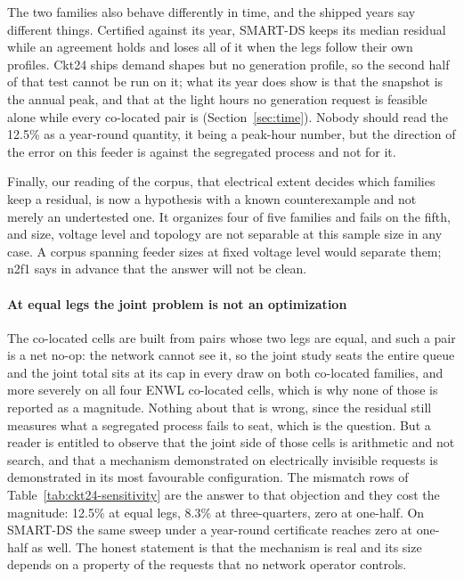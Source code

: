 \documentclass[review,authoryear,12pt]{elsarticle}
\begin{document}
The two families also behave differently in time, and the shipped years say
different things. Certified against its year, SMART-DS keeps its median
residual while an agreement holds and loses all of it when the legs follow
their own profiles. Ckt24 ships demand shapes but no generation profile, so the
second half of that test cannot be run on it; what its year does show is that
the snapshot is the annual peak, and that at the light hours no generation
request is feasible alone while every co-located pair is
(Section~\ref{sec:time}). Nobody should read the 12.5\% as a year-round
quantity, it being a peak-hour number, but the direction of the error on
this feeder is against the segregated process and not for it.

Finally, our reading of the corpus, that electrical extent decides which
families keep a residual, is now a hypothesis with a known counterexample
and not merely an undertested one. It organizes four of five families and
fails on the fifth, and size, voltage level and topology are not separable at
this sample size in any case. A corpus spanning feeder sizes at fixed voltage
level would separate them; n2f1 says in advance that the answer will not be
clean.

\paragraph{At equal legs the joint problem is not an optimization}
The co-located cells are built from pairs whose two legs are equal, and such a
pair is a net no-op: the network cannot see it, so the joint study seats the
entire queue and the joint total sits at its cap in every draw on both
co-located families, and more severely on all four ENWL co-located cells,
which is why none of those is reported as a magnitude. Nothing about that is
wrong, since the residual still measures what a segregated process fails to
seat, which is the question. But a reader is entitled to observe that the joint
side of those cells is arithmetic and not search, and that a mechanism
demonstrated on electrically invisible requests is demonstrated in its most
favourable configuration. The mismatch
rows of Table~\ref{tab:ckt24-sensitivity} are the answer to that objection and
they cost the magnitude: 12.5\% at equal legs, 8.3\% at three-quarters, zero at
one-half. On SMART-DS the same sweep under a year-round certificate reaches
zero at one-half as well. The honest statement is that the mechanism is real
and its size depends on a property of the requests that no network operator
controls.
\end{document}
